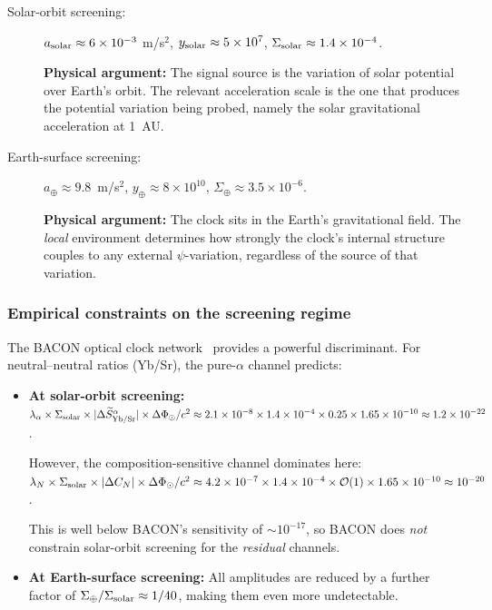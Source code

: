 \documentclass[twocolumn,showpacs,preprintnumbers,amsmath,amssymb,prd]{revtex4-2}
\begin{document}
\begin{description}
\item[Solar-orbit screening:] $a_{\rm solar} \approx 6 \times 10^{-3}$
  m/s$^2$, $y_{\rm solar} \approx 5 \times 10^7$,
  $\Sigma_{\rm solar} \approx 1.4 \times 10^{-4}$.

  \textbf{Physical argument:} The signal source is the variation of
  solar potential over Earth's orbit.  The relevant acceleration
  scale is the one that produces the potential variation being
  probed, namely the solar gravitational acceleration at 1~AU.

\item[Earth-surface screening:] $a_\oplus \approx 9.8$~m/s$^2$,
  $y_\oplus \approx 8 \times 10^{10}$,
  $\Sigma_\oplus \approx 3.5 \times 10^{-6}$.

  \textbf{Physical argument:} The clock sits in the Earth's
  gravitational field.  The \emph{local} environment determines
  how strongly the clock's internal structure couples to any
  external $\psi$-variation, regardless of the source of that
  variation.
\end{description}

\subsubsection{Empirical constraints on the screening regime}
\label{sec:bacon-constraint}

The BACON optical clock network~\cite{Beloy2021} provides a
powerful discriminant.  For neutral--neutral ratios (Yb/Sr),
the pure-$\alpha$ channel predicts:

\begin{itemize}
\item \textbf{At solar-orbit screening:}
  $\lambda_\alpha \times \Sigma_{\rm solar} \times
  |\Delta\widetilde{S}^\alpha_{\rm Yb/Sr}| \times
  \Delta\Phi_\odot/c^2
  \approx 2.1 \times 10^{-8} \times 1.4 \times 10^{-4}
  \times 0.25 \times 1.65 \times 10^{-10}
  \approx 1.2 \times 10^{-22}$.

  However, the composition-sensitive channel dominates here:
  $\lambda_N \times \Sigma_{\rm solar} \times |\Delta C_N|
  \times \Delta\Phi_\odot/c^2
  \approx 4.2 \times 10^{-7} \times 1.4 \times 10^{-4}
  \times \mathcal{O}(1) \times 1.65 \times 10^{-10}
  \approx 10^{-20}$.

  This is well below BACON's sensitivity of
  $\sim 10^{-17}$, so BACON does \emph{not} constrain
  solar-orbit screening for the \emph{residual} channels.

\item \textbf{At Earth-surface screening:}
  All amplitudes are reduced by a further factor of
  $\Sigma_\oplus/\Sigma_{\rm solar} \approx 1/40$, making
  them even more undetectable.
\end{itemize}
\end{document}
